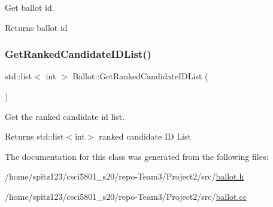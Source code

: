 Get ballot id. 

\begin{DoxyReturn}{Returns}
ballot id 
\end{DoxyReturn}
\mbox{\label{classBallot_a5107d9df309cc5b7ff4a237799e3bff5}} 
\subsubsection{\texorpdfstring{Get\+Ranked\+Candidate\+I\+D\+List()}{GetRankedCandidateIDList()}}
{\footnotesize\ttfamily std\+::list$<$ int $>$ Ballot\+::\+Get\+Ranked\+Candidate\+I\+D\+List (\begin{DoxyParamCaption}{ }\end{DoxyParamCaption})}



Get the ranked candidate id list. 

\begin{DoxyReturn}{Returns}
std\+::list$<$int$>$ ranked candidate ID List 
\end{DoxyReturn}


The documentation for this class was generated from the following files\+:\begin{DoxyCompactItemize}
\item 
/home/spitz123/csci5801\+\_\+s20/repo-\/\+Team3/\+Project2/src/\hyperlink{ballot_8h}{ballot.\+h}\item 
/home/spitz123/csci5801\+\_\+s20/repo-\/\+Team3/\+Project2/src/\hyperlink{ballot_8cc}{ballot.\+cc}\end{DoxyCompactItemize}
